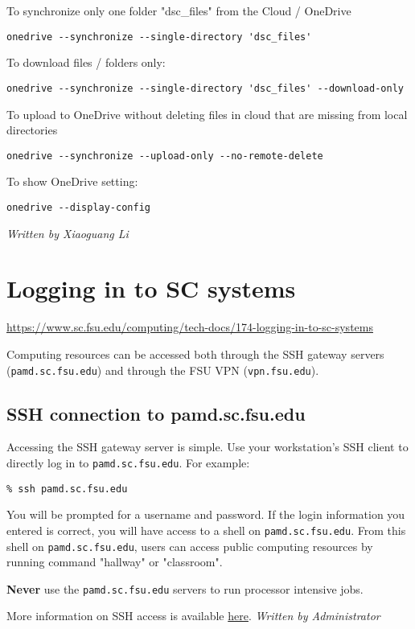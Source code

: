 \documentclass[12pt,a4paper]{article}
\begin{document}
To synchronize only one folder "dsc\_files" from the Cloud / OneDrive
\begin{verbatim}
onedrive --synchronize --single-directory 'dsc_files'
\end{verbatim}
To download files / folders only:
\begin{verbatim}
onedrive --synchronize --single-directory 'dsc_files' --download-only
\end{verbatim}
To upload to OneDrive without deleting files in cloud that are missing from local directories
\begin{verbatim}
onedrive --synchronize --upload-only --no-remote-delete
\end{verbatim}
To show OneDrive setting:
\begin{verbatim}
onedrive --display-config
\end{verbatim}
\hfill \textit{Written by Xiaoguang Li}

\section{Logging in to SC systems}
\url{https://www.sc.fsu.edu/computing/tech-docs/174-logging-in-to-sc-systems}

Computing resources can be accessed both through the SSH gateway servers (\texttt{pamd.sc.fsu.edu}) and through the FSU VPN (\texttt{vpn.fsu.edu}).

\subsection*{SSH connection to pamd.sc.fsu.edu}
Accessing the SSH gateway server is simple. Use your workstation's SSH client to directly log in to \texttt{pamd.sc.fsu.edu}. For example:
\begin{verbatim}
% ssh pamd.sc.fsu.edu
\end{verbatim}
You will be prompted for a username and password. If the login information you entered is correct, you will have access to a shell on \texttt{pamd.sc.fsu.edu}. From this shell on \texttt{pamd.sc.fsu.edu}, users can access public computing resources by running command "hallway" or "classroom".

\textbf{Never} use the \texttt{pamd.sc.fsu.edu} servers to run processor intensive jobs.

More information on SSH access is available \href{https://www.sc.fsu.edu/computing/tech-docs/345-using-ssh}{here}.
\hfill \textit{Written by Administrator}
\end{document}

